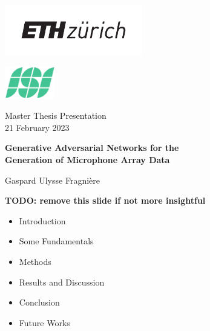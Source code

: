 \documentclass[12pt,pdftex,16x10]{elpres} %
\begin{document}
\begin{titlepage}
  \centering
  \parbox{0.6\textwidth}{\includegraphics[height=2.2cm]{resources/ethlogo_short}}
  \hfill
  \parbox{0.35\textwidth}{ 
    \mbox{}\hfill \includegraphics[height=1.4cm]{resources/isilogo_plain}}
  
  Master Thesis Presentation\\
  21 February 2023
  
  \LARGE
  \textbf{Generative Adversarial Networks for the\\
  Generation of Microphone Array Data}
  

  \normalsize
  Gaspard Ulysse Fragnière

\end{titlepage}



\begin{psli}[Agenda]
  \textbf{TODO: remove this slide if not more insightful}
  \begin{itemize}
    \item Introduction
    \item Some Fundamentals
    \item Methods
    \item Results and Discussion
    \item Conclusion
    \item Future Works
  \end{itemize}
\end{psli}
\end{document}
